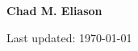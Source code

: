 \documentclass[12pt,letterpaper]{article}
\def\name{Chad M. Eliason}  %
\def\footerlink{}
\begin{document}

\pagestyle{empty}


\centerline{\bf\huge\name}
\vspace{0.25in}




\bigskip

\begin{center}
  \begin{footnotesize}
    Last updated: \today \\
    \href{\footerlink}{\texttt{\footerlink}}
  \end{footnotesize}
\end{center}
\end{document}
